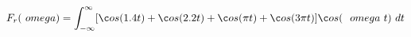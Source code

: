 \documentclass[preview]{standalone}
\begin{document}
\begin{align*}
F_{r}(\ o m e g a )=\int_{-\infty}^{\infty}[\c o s{(1.4t)}+\c o s{(2.2t)}+\c o s{(\pi t)}+\c o s{(3\pi t)}]\c o s{( \ \ o m e g a  \ t)} \ dt
\end{align*}
\end{document}
